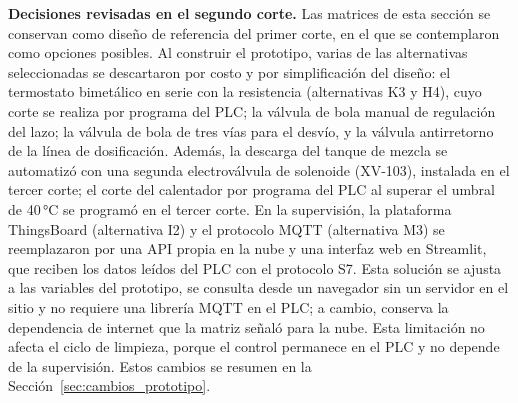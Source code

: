 \textbf{Decisiones revisadas en el segundo corte.} Las matrices de esta sección se conservan como diseño de referencia del primer corte, en el que se contemplaron como opciones posibles. Al construir el prototipo, varias de las alternativas seleccionadas se descartaron por costo y por simplificación del diseño: el termostato bimetálico en serie con la resistencia (alternativas K3 y H4), cuyo corte se realiza por programa del PLC; la válvula de bola manual de regulación del lazo; la válvula de bola de tres vías para el desvío, y la válvula antirretorno de la línea de dosificación. Además, la descarga del tanque de mezcla se automatizó con una segunda electroválvula de solenoide (XV-103), instalada en el tercer corte; el corte del calentador por programa del PLC al superar el umbral de 40\,°C se programó en el tercer corte. En la supervisión, la plataforma ThingsBoard (alternativa I2) y el protocolo MQTT (alternativa M3) se reemplazaron por una API propia en la nube y una interfaz web en Streamlit, que reciben los datos leídos del PLC con el protocolo S7. Esta solución se ajusta a las variables del prototipo, se consulta desde un navegador sin un servidor en el sitio y no requiere una librería MQTT en el PLC; a cambio, conserva la dependencia de internet que la matriz señaló para la nube. Esta limitación no afecta el ciclo de limpieza, porque el control permanece en el PLC y no depende de la supervisión. Estos cambios se resumen en la Sección~\ref{sec:cambios_prototipo}.
